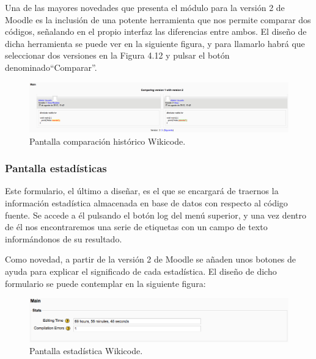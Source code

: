 Una de las mayores novedades que presenta el módulo para la versión 2 de Moodle es la inclusión de una potente herramienta que nos permite comparar dos códigos, señalando en el propio interfaz las diferencias entre ambos. El diseño de dicha herramienta se puede ver en la siguiente figura, y para llamarlo habrá que seleccionar dos versiones en la Figura 4.12 y pulsar el botón denominado``Comparar''.

\begin{figure}[h]
	\begin{center}
	\includegraphics[width=\textwidth]{./img/c4diff.eps}
	\caption{Pantalla comparación histórico Wikicode.}
	\end{center}
\end{figure}

\subsubsection{Pantalla estadísticas}

Este formulario, el último a diseñar, es el que se encargará de traernos la información estadística almacenada en base de datos con respecto al código fuente. Se accede a él pulsando el botón log del menú superior, y una vez dentro de él nos encontraremos una serie de etiquetas con un campo de texto informándonos de su resultado.

Como novedad, a partir de la versión 2 de Moodle se añaden unos botones de ayuda para explicar el significado de cada estadística. El diseño de dicho formulario se puede contemplar en la siguiente figura:

\begin{figure}[h]
	\begin{center}
	\includegraphics[width=\textwidth]{./img/c4log.eps}
	\caption{Pantalla estadística Wikicode.}
	\end{center}
\end{figure}

